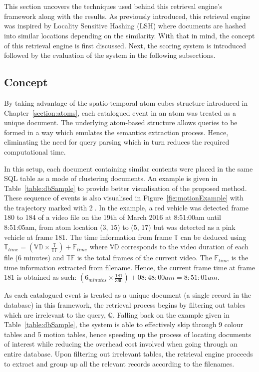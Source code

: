 \section{\versionOneRet}
\label{section:versionOne}
This section uncovers the techniques used behind this retrieval engine's framework along with the results. As previously introduced, this retrieval engine was inspired by Locality Sensitive Hashing (LSH) where documents are hashed into similar locations depending on the similarity. With that in mind,  the concept of this retrieval engine is first discussed. Next, the scoring system is introduced followed by the evaluation of the system in the following subsections.

\subsection{Concept}
\label{versionOneConcept}
By taking advantage of the spatio-temporal atom cubes structure introduced in Chapter~\ref{section:atoms}, each catalogued event in an atom was treated as a unique document. The underlying atom-based structure allows queries to be formed in a way which emulates the semantics extraction process. Hence, eliminating the need for query parsing which in turn reduces the required computational time.

In this setup, each document containing similar contents were placed in the same SQL table as a mode of clustering documents. An example is given in Table~\ref{table:dbSample} to provide better visualisation of the proposed method. These sequence of events is also visualised in Figure~\ref{fig:motionExample} with the trajectory marked with \textcircled{2}.
In the example, a red vehicle was detected frame 180 to 184 of a video file on the 19th of March 2016 at 8:51:00am until 8:51:05am, from atom location (3, 15) to (5, 17) but was detected as a pink vehicle at frame 181.
The time information from frame $\mathbb{T}$ can be deduced using $\mathbb{T}_{time}  = (\mathbb{VD} \times \frac{\mathbb{T}}{\mathbb{TF}}) + \mathbb{F}_{time}$ where $\mathbb{VD}$ corresponds to the video duration of each file (6 minutes) and $\mathbb{TF}$ is the total frames of the current video. The $\mathbb{F}_{time}$ is the time information extracted from filename.
Hence, the current frame time at frame 181 is obtained as such: $(6_{minutes} \times \frac{181}{360}) + 08:48:00am = 8:51:01am$.

As each catalogued event is treated as a unique document (a single record in the database) in this framework, the retrieval process begins by filtering out tables which are irrelevant to the query, $\mathbb{Q}$. Falling back on the example given in Table~\ref{table:dbSample}, the system is able to effectively skip through 9 colour tables and 5 motion tables, hence speeding up the process of locating documents of interest while reducing the overhead cost involved when going through an entire database. Upon filtering out irrelevant tables, the retrieval engine proceeds to extract and group up all the relevant records according to the filenames.

